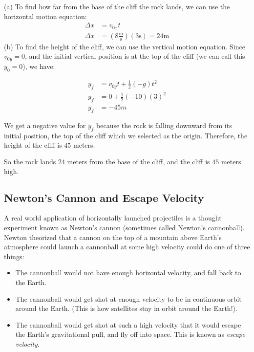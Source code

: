 \begin{Answer}[ref=projectiles_horiz1]
(a) To find how far from the base of the cliff the rock lands, we can use the horizontal motion equation:
\begin{align*}
    \Delta x &= v_{0x} t\\
    \Delta x &= (8 \tfrac{\text{m}}{\text{s}})(3 \text{s}) = 24 \text{m}
\end{align*}
(b) To find the height of the cliff, we can use the vertical motion equation. Since $v_{0y} = 0$, and the initial vertical position is at the top of the cliff (we can call this $y_0 = 0$), we have:

\begin{align*}
    y_f &= v_{0y} t + \frac{1}{2} (-g) t^2 \\
    y_f &= 0 + \frac{1}{2} (-10) (3)^{2} \\
    y_f &= -45 m
\end{align*}

We get a negative value for $y_f$ because the rock is falling downward from its initial position, the top of the cliff which we selected as the origin. Therefore, the height of the cliff is $45$ meters.

So the rock lands $24$ meters from the base of the cliff, and the cliff is $45$ meters high.

\end{Answer}

\subsection{Newton's Cannon and Escape Velocity}
A real world application of horizontally launched projectiles is a thought experiment known as Newton's cannon (sometimes called Newton's cannonball). Newton theorized that a cannon on the top of a mountain above Earth's atmosphere could launch a cannonball at some high velocity could do one of three things:
\begin{itemize}
    \item The cannonball would not have enough horizontal velocity, and fall back to the Earth. 
    \item The cannonball would get shot at enough velocity to be in continuous orbit around the Earth. (This is how satellites stay in orbit around the Earth!).
    \item The cannonball would get shot at such a high velocity that it would escape the Earth's gravitational pull, and fly off into space. This is known as \emph{escape velocity}. 
\end{itemize}

